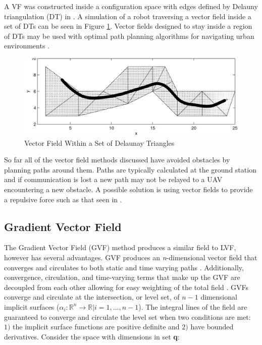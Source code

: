 \documentclass[numbered,pdftex]{ohio-etd}
\begin{document}
A VF was constructed inside a configuration space with edges defined by Delauny triangulation (DT) in \cite{pimenta_fully_2007}.  A simulation of a robot traversing a vector field inside a set of DTs can be seen in Figure \ref{fig:cdtVF}. Vector fields designed to stay inside a region of DTs may be used with optimal path planning algorithms for navigating urban environments \cite{md_simplex_2017}.


\begin{figure}
	\centering
	\includegraphics[width=15cm]{PaperFigures/cdtVF}
	\caption{Vector Field Within a Set of Delaunay Triangles \cite{pimenta_fully_2007}}
	\label{fig:cdtVF}
\end{figure}

So far all of the vector field methods discussed have avoided obstacles by planning paths around them. Paths are typically calculated at the ground station and if communication is lost a new path may not be relayed to a UAV encountering a new obstacle. A possible solution is using vector fields to provide a repulsive force such as that seen in \cite{panagou_motion_2014,zhou_vector_2014,wilhelm_2019}. 

\subsection{Gradient Vector Field}
The Gradient Vector Field (GVF) method produces a similar field to LVF, however has several advantages. GVF produces an \textit{n}-dimensional vector field that converges and circulates to both static and time varying paths \cite{goncalves_artificial_2009}. Additionally, convergence, circulation, and time-varying terms that make up the GVF are decoupled from each other allowing for easy weighting of the total field \cite{goncalves_circulation_2010}. GVFs converge and circulate at the intersection, or level set, of $n-1$ dimensional implicit surfaces ($\alpha_i:\mathbb{R}^n\rightarrow\mathbb{R} | i=1,...,n-1$). The integral lines of the field are guaranteed to converge and circulate the level set when two conditions are met: $1)$ the implicit surface functions are positive definite and $2)$ have bounded derivatives. Consider the space with dimensions in set \textbf{q}:
\end{document}
